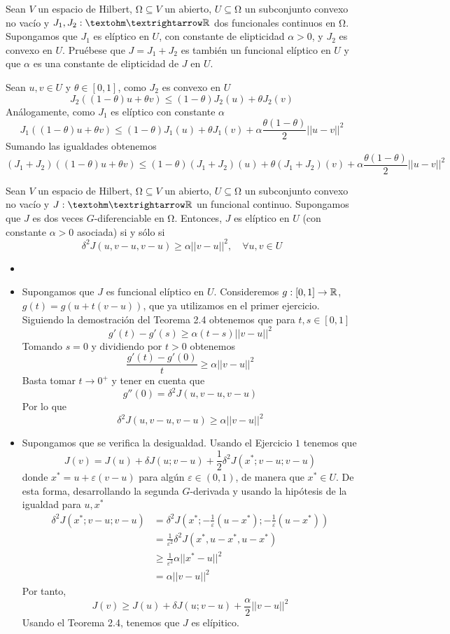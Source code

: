 \documentclass[twoside]{article}
\begin{document}
\begin{ejercicio}{3}
Sean $V$ un espacio de Hilbert, $Ω ⊆ V$ un abierto, $U ⊆ Ω$ un subconjunto convexo no vacío y $J_1, J_2 : Ω → \R$ dos funcionales continuos en $Ω$. Supongamos que $J_1$ es elíptico en $U$, con constante de elipticidad $α > 0$, y $J_2$ es convexo en $U$. Pruébese que $J = J_1 + J_2$ es también un
funcional elíptico en $U$ y que $α$ es una constante de elipticidad de $J$ en $U$.
\end{ejercicio}
\begin{solucion}
Sean $u,v\in U$ y $\theta \in [0,1]$, como $J_2$ es convexo en $U$
$$
J_2((1-\theta)u+\theta v) \leq (1-\theta)J_2(u) + \theta J_2(v)
$$
Análogamente, como $J_1$ es elíptico con constante $\alpha$ 
$$
J_1((1-\theta)u+\theta v) \leq (1-\theta)J_1(u) + \theta J_1(v) + \alpha\frac{\theta(1-\theta)}{2}||u-v||^2
$$
Sumando las igualdades obtenemos
$$
(J_1+J_2)((1-\theta)u+\theta v) \leq (1-\theta)(J_1+J_2)(u) + \theta (J_1+J_2)(v) + \alpha\frac{\theta(1-\theta)}{2}||u-v||^2
$$
\end{solucion}
\newpage
\begin{ejercicio}{4}
Sean $V$ un espacio de Hilbert, $Ω ⊆ V$ un abierto, $U ⊆ Ω$ un subconjunto convexo no vacío y $J : Ω → \R$ un funcional continuo. Supongamos que $J$ es dos veces $G$-diferenciable en $Ω$. Entonces, $J$ es elíptico en $U$ (con constante $α > 0$ asociada) si y sólo si
$$
\delta^2 J(u,v-u,v-u)\geq \alpha ||v-u||^2, \quad \forall u,v\in U				
$$
\end{ejercicio}
\begin{solucion}
\begin{itemize}
\item[]
\item Supongamos que $J$ es funcional elíptico en $U$. Consideremos $g:[0,1]\to \mathbb{R}$, $g(t) = g(u+t(v-u))$, que ya utilizamos en el primer ejercicio. Siguiendo la demostración del Teorema 2.4 obtenemos que para $t,s\in[0,1]$
$$
g'(t)-g'(s)\geq \alpha(t-s)||v-u||^2
$$
Tomando $s=0$ y dividiendo por $t>0$ obtenemos
$$
\frac{g'(t)-g'(0)}{t}\geq \alpha||v-u||^2
$$
Basta tomar $t\to0^+$ y tener en cuenta que
$$
g''(0) = \delta^2 J(u,v-u,v-u)
$$
Por lo que
$$
\delta^2 J(u,v-u,v-u) \geq \alpha ||v-u||^2
$$
\item Supongamos que se verifica la desigualdad. Usando el Ejercicio $1$ tenemos que
$$
J(v) = J(u) + \delta J(u;v-u) + \frac{1}{2}\delta^2 J(x^*;v-u;v-u)
$$
donde $x^* = u + \varepsilon (v-u)$ para algún $\varepsilon\in(0,1)$, de manera que $x^* \in U$. De esta forma, desarrollando la segunda $G$-derivada y usando la hipótesis de la igualdad para $u,x^*$
\begin{align*}
 \delta^2 J(x^*;v-u;v-u) & = \delta^2 J(x^*;-\frac{1}{\varepsilon}(u-x^*);-\frac{1}{\varepsilon}(u-x^*))\\
 &= \frac{1}{\varepsilon^2}\delta^2 J (x^*,u-x^*,u-x^*)\\
 &\geq \frac{1}{\varepsilon^2}  \alpha ||x^*-u||^2\\
 &= \alpha||v-u||^2
\end{align*}
Por tanto,
$$
J(v)\geq J(u)+\delta J(u;v-u) + \frac{\alpha}{2}||v-u||^2
$$
Usando el Teorema 2.4, tenemos que $J$ es elípitico.
\end{itemize}
\end{solucion}
\end{document}
